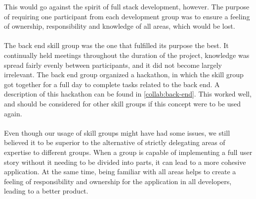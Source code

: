 This would go against the spirit of full stack development, however.
The purpose of requiring one participant from each development group was to ensure a feeling of ownership, responsibility and knowledge of all areas, which would be lost.
\\\\
The back end skill group was the one that fulfilled its purpose the best.
It continually held meetings throughout the duration of the project, knowledge was spread fairly evenly between participants, and it did not become largely irrelevant.
The back end group organized a hackathon, in which the skill group got together for a full day to complete tasks related to the back end.
A description of this hackathon can be found in \autoref{collab:back-end}.
This worked well, and should be considered for other skill groups if this concept were to be used again.
\\\\
Even though our usage of skill groups might have had some issues, we still believed it to be superior to the alternative of strictly delegating areas of expertise to different groups.
When a group is capable of implementing a full user story without it needing to be divided into parts, it can lead to a more cohesive application.
At the same time, being familiar with all areas helps to create a feeling of responsibility and ownership for the application in all developers, leading to a better product.
